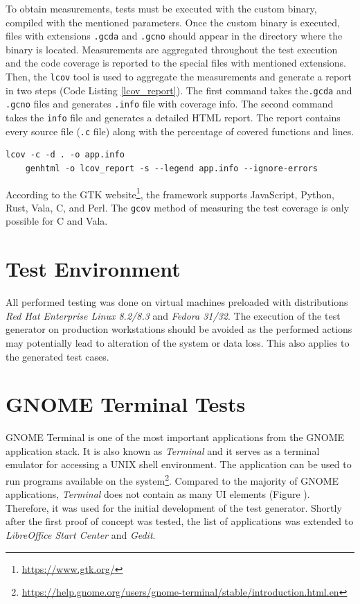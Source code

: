 To obtain measurements, tests must be executed with the custom binary, compiled with the mentioned parameters. Once the custom binary is executed, files with extensions \texttt{.gcda} and \texttt{.gcno} should appear in the directory where the binary is located. Measurements are aggregated throughout the test execution and the code coverage is reported to the special files with mentioned extensions. Then, the \texttt{lcov} tool is used to aggregate the measurements and generate a report in two steps (Code Listing \ref{lcov_report}). The first command takes the\texttt{.gcda} and \texttt{.gcno} files and generates \texttt{.info} file with coverage info. The second command takes the \texttt{info} file and generates a detailed HTML report. The report contains every source file (\texttt{.c} file) along with the percentage of covered functions and lines.

\begin{lstlisting}[language=Gherkin,caption={Shell commands used to generate an HTML report with \texttt{lcov} tool},label={lcov_report}]
    lcov -c -d . -o app.info
    genhtml -o lcov_report -s --legend app.info --ignore-errors
\end{lstlisting}

According to the GTK website\footnote{\url{https://www.gtk.org/}}, the framework supports JavaScript, Python, Rust, Vala, C, and Perl. The \verb|gcov| method of measuring the test coverage is only possible for C and Vala.    
\section{Test Environment}
All performed testing was done on virtual machines preloaded with distributions \textit{Red Hat Enterprise Linux 8.2/8.3} and \textit{Fedora 31/32}. The execution of the test generator on production workstations should be avoided as the performed actions may potentially lead to alteration of the system or data loss.  This also applies to the generated test cases. 

\newpage
\section{GNOME Terminal Tests}
GNOME Terminal is one of the most important applications from the GNOME application stack. It is also known as \textit{Terminal} and it serves as a terminal emulator for accessing a UNIX shell environment. The application can be used to run programs available on the system\footnote{\url{https://help.gnome.org/users/gnome-terminal/stable/introduction.html.en}}. Compared to the majority of GNOME applications, \textit{Terminal} does not contain as many UI elements (Figure ). Therefore, it was used for the initial development of the test generator. Shortly after the first proof of concept was tested, the list of applications was extended to \textit{LibreOffice Start Center} and \textit{Gedit}. 

